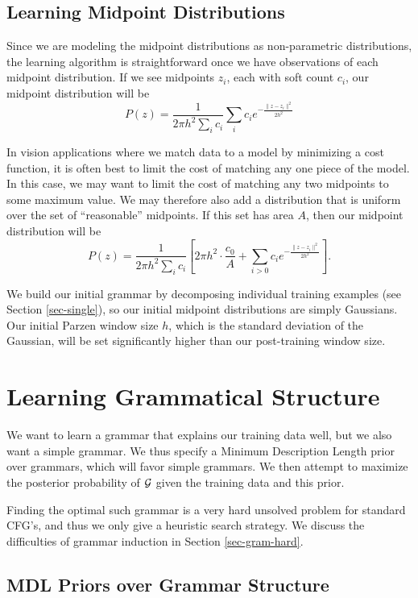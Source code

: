 \documentclass{article}
\begin{document}
\subsection{Learning Midpoint Distributions}
\label{sec-learn-midpoint}

Since we are modeling the midpoint distributions as non-parametric
distributions, the learning algorithm is straightforward once we have
observations of each midpoint distribution. If we see midpoints $z_i$,
each with soft count $c_i$, our midpoint distribution will be
$$P(z) = \frac{1}{2\pi h^2\sum_i c_i} \sum_i c_i e^{-\frac{\| z - z_i\|^2}{2h^2}}$$

In vision applications where we match data to a model by minimizing a
cost function, it is often best to limit the cost of matching any one
piece of the model. In this case, we may want to limit the cost of
matching any two midpoints to some maximum value. We may therefore
also add a distribution that is uniform over the set of ``reasonable''
midpoints. If this set has area $A$, then our midpoint distribution
will be
$$P(z) = \frac{1}{2\pi h^2\sum_i c_i} \left[2\pi h^2 \cdot \frac{c_0}{A} + \sum_{i>0} c_i
  e^{-\frac{\| z - z_i\|^2}{2h^2}}\right].$$

We build our initial grammar by decomposing individual training
examples (see Section \ref{sec-single}), so our initial midpoint
distributions are simply Gaussians. Our initial Parzen window size
$h$, which is the standard deviation of the Gaussian, will be set
significantly higher than our post-training window size.


\section{Learning Grammatical Structure}
\label{sec-learn-struct}

We want to learn a grammar that explains our training data well, but
we also want a simple grammar. We thus specify a Minimum Description
Length prior over grammars, which will favor simple grammars. We then
attempt to maximize the posterior probability of ${\mathcal G}$ given the
training data and this prior.

Finding the optimal such grammar is a very hard unsolved problem for
standard CFG's, and thus we only give a heuristic search strategy.  We
discuss the difficulties of grammar induction in Section \ref{sec-gram-hard}.

\subsection{MDL Priors over Grammar Structure}
\label{sec-mdl}
\end{document}
